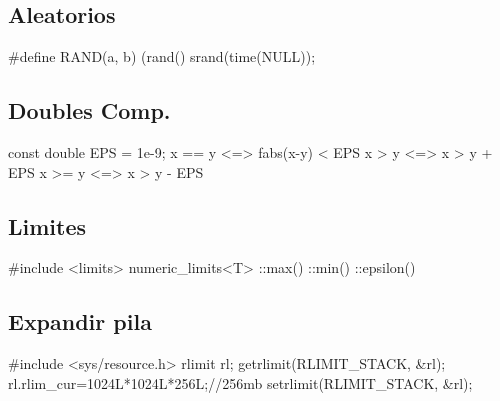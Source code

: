 \subsection*{Aleatorios}
\begin{code}
#define RAND(a, b) (rand()%
srand(time(NULL));
\end{code}
\subsection*{Doubles Comp.}
\begin{code}
const double EPS = 1e-9;
x == y	<=> fabs(x-y) < EPS
x >  y	<=> x > y + EPS
x >= y	<=> x > y - EPS
\end{code}
\subsection*{Limites}
\begin{code}
#include <limits>
numeric_limits<T>
	::max()
	::min()
	::epsilon()
\end{code}
\subsection*{Expandir pila}
\begin{code}
#include <sys/resource.h>
rlimit rl;
getrlimit(RLIMIT_STACK, &rl);
rl.rlim_cur=1024L*1024L*256L;//256mb
setrlimit(RLIMIT_STACK, &rl);
\end{code}
